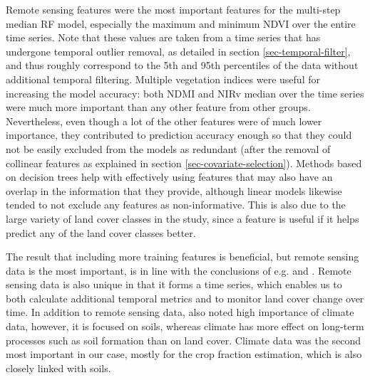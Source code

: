 \documentclass[review,authoryear,3p]{elsarticle}
\begin{document}
Remote sensing features were the most important features for the multi-step median \gls{RF} model, especially the maximum and minimum \gls{NDVI} over the entire time series.
Note that these values are taken from a time series that has undergone temporal outlier removal, as detailed in section \ref{sec-temporal-filter}, and thus roughly correspond to the 5th and 95th percentiles of the data without additional temporal filtering.
Multiple vegetation indices were useful for increasing the model accuracy: both \gls{NDMI} and \gls{NIRv} median over the time series were much more important than any other feature from other groups.
Nevertheless, even though a lot of the other features were of much lower importance, they contributed to prediction accuracy enough so that they could not be easily excluded from the models as redundant (after the removal of collinear features as explained in section \ref{sec-covariate-selection}).
Methods based on decision trees help with effectively using features that may also have an overlap in the information that they provide, although linear models likewise tended to not exclude any features as non-informative.
This is also due to the large variety of land cover classes in the study, since a feature is useful if it helps predict any of the land cover classes better.

The result that including more training features is beneficial, but remote sensing data is the most important, is in line with the conclusions of e.g. \citet{li_monitoring_2018} and \citet{hengl_soilgrids250m_2017}.
Remote sensing data is also unique in that it forms a time series, which enables us to both calculate additional temporal metrics and to monitor land cover change over time.
In addition to remote sensing data, \citet{hengl_soilgrids250m_2017} also noted high importance of climate data, however, it is focused on soils, whereas climate has more effect on long-term processes such as soil formation than on land cover.
Climate data was the second most important in our case, mostly for the crop fraction estimation, which is also closely linked with soils.
\end{document}

